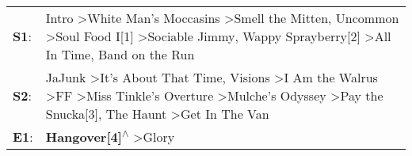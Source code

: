 \begin{supertabular}{p{0.03\textwidth}p{0.92\textwidth}}
 \textbf{S1}:  &                                                            Intro\textsuperscript{} \textgreater \enspace White Man's Moccasins\textsuperscript{} \textgreater \enspace Smell the Mitten\textsuperscript{}, \enspace Uncommon\textsuperscript{} \textgreater \enspace Soul Food I[1]\textsuperscript{} \textgreater \enspace Sociable Jimmy\textsuperscript{}, \enspace Wappy Sprayberry[2]\textsuperscript{} \textgreater \enspace All In Time\textsuperscript{}, \enspace Band on the Run\textsuperscript{}  \enspace  \\
 \textbf{S2}:  &  JaJunk\textsuperscript{} \textgreater \enspace It's About That Time\textsuperscript{}, \enspace Visions\textsuperscript{} \textgreater \enspace I Am the Walrus\textsuperscript{} \textgreater \enspace FF\textsuperscript{} \textgreater \enspace Miss Tinkle's Overture\textsuperscript{} \textgreater \enspace Mulche's Odyssey\textsuperscript{} \textgreater \enspace Pay the Snucka[3]\textsuperscript{}, \enspace The Haunt\textsuperscript{} \textgreater \enspace Get In The Van\textsuperscript{}  \enspace  \\
 \textbf{E1}:  &                                                                                                                                                                                                                                                                                                                                                                                                                 \textbf{Hangover[4]\textsuperscript{$\wedge$}} \textgreater \enspace Glory\textsuperscript{}  \enspace  \\
\end{supertabular}
